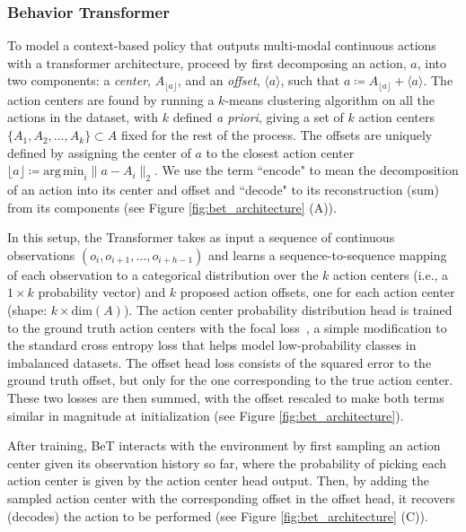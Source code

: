 \subsubsection{Behavior Transformer}\label{model:bet}
To model a context-based policy that outputs multi-modal continuous actions with a transformer architecture, \citet{shafiullah2022behavior} proceed by first decomposing an action, $a$, into two components: a \emph{center}, $A_{\lfloor a \rfloor}$, and an \emph{offset}, $\langle a \rangle$, such that $a \coloneqq A_{\lfloor a \rfloor} + \langle a \rangle$.
The action centers are found by running a $k$-means clustering algorithm on all the actions in the dataset, with $k$ defined \textit{a priori}, giving a set of $k$ action centers $\{A_1, A_2, \ldots, A_k\} \subset A$ fixed for the rest of the process. 
The offsets are uniquely defined by assigning the center of $a$ to the closest action center $\lfloor a \rfloor \coloneqq \mathrm{arg\,min}_i \|a - A_i \|_2$.
We use the term ``encode" to mean the decomposition of an action into its center and offset and ``decode" to its reconstruction (sum) from its components (see Figure \ref{fig:bet_architecture} (A)).

In this setup, the Transformer takes as input a sequence of continuous observations $(o_i, o_{i+1}, \ldots, o_{i+h-1})$ and learns a sequence-to-sequence mapping of each observation to a categorical distribution over the $k$ action centers (i.e., a $1 \times k$ probability vector) and $k$ proposed action offsets, one for each action center (shape: $k \times \mathrm{dim}(A)$).
The action center probability distribution head is trained to the ground truth action centers with the focal loss~\cite{lin_focal_2018}, a simple modification to the standard cross entropy loss that helps model low-probability classes in imbalanced datasets.
The offset head loss consists of the squared error to the ground truth offset, but only for the one corresponding to the true action center.
These two losses are then summed, with the offset rescaled to make both terms similar in magnitude at initialization (see Figure \ref{fig:bet_architecture}). 

After training, BeT interacts with the environment by first sampling an action center given its observation history so far, where the probability of picking each action center is given by the action center head output.
Then, by adding the sampled action center with the corresponding offset in the offset head, it recovers (decodes) the action to be performed (see Figure \ref{fig:bet_architecture} (C)).


